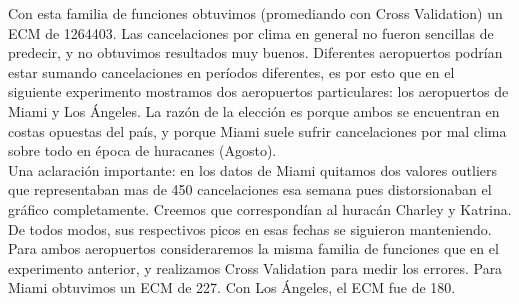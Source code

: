 Con esta familia de funciones obtuvimos (promediando con Cross Validation) un ECM de 1264403. Las cancelaciones por clima en general no fueron sencillas de predecir, y no obtuvimos resultados muy buenos. Diferentes aeropuertos podrían estar sumando cancelaciones en períodos diferentes, es por esto que en el siguiente experimento mostramos dos aeropuertos particulares: los aeropuertos de Miami y Los Ángeles. La razón de la elección es porque ambos se encuentran en costas opuestas del país, y porque Miami suele sufrir cancelaciones por mal clima sobre todo en época de huracanes (Agosto). \\

Una aclaración importante: en los datos de Miami quitamos dos valores outliers que representaban mas de 450 cancelaciones esa semana pues distorsionaban el gráfico completamente. Creemos que correspondían al huracán Charley y Katrina. De todos modos, sus respectivos picos en esas fechas se siguieron manteniendo. \\

Para ambos aeropuertos consideraremos la misma familia de funciones que en el experimento anterior, y realizamos Cross Validation para medir los errores. Para Miami obtuvimos un ECM de 227. Con Los Ángeles, el ECM fue de 180.




